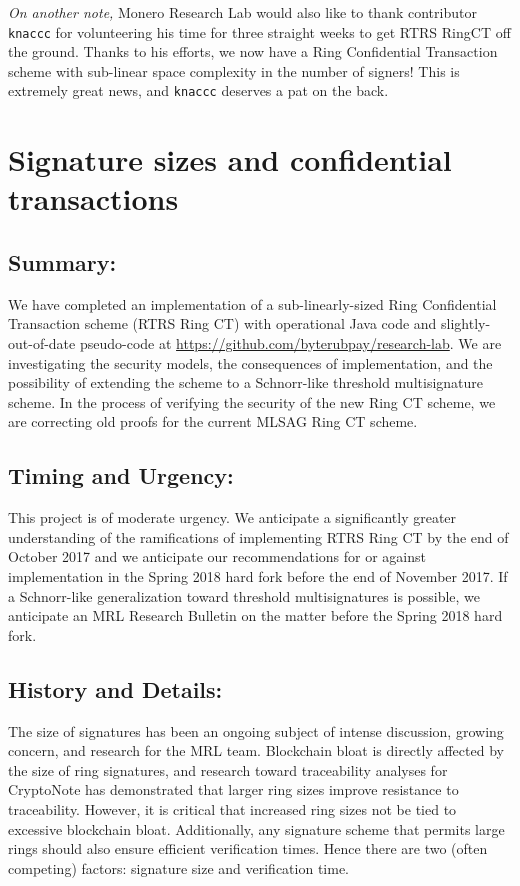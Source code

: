 \documentclass[12pt,english]{mrl}
\theoremstyle{definition}
\numberwithin{equation}{section}
\numberwithin{figure}{section}
\numberwithin{equation}{section}
\numberwithin{equation}{section}
\numberwithin{figure}{section}
\begin{document}
\textit{On another note,} Monero Research Lab would also like to thank contributor \texttt{knaccc} for volunteering his time for three straight weeks to get RTRS RingCT off the ground. Thanks to his efforts, we now have a Ring Confidential Transaction scheme with sub-linear space complexity in the number of signers! This is extremely great news, and \texttt{knaccc} deserves a pat on the back.


\vspace{0.1in}

\section{Signature sizes and confidential transactions} \label{secOne}

\subsection{Summary:} 

We have completed an implementation of a sub-linearly-sized Ring Confidential Transaction scheme (RTRS Ring CT) with operational Java code and slightly-out-of-date pseudo-code at \url{https://github.com/byterubpay/research-lab}. We are investigating the security models, the consequences of implementation, and the possibility of extending the scheme to a Schnorr-like threshold multisignature scheme. In the process of verifying the security of the new Ring CT scheme, we are correcting old proofs for the current MLSAG Ring CT scheme.

\subsection{Timing and Urgency:} 

This project is of moderate urgency. We anticipate a significantly greater understanding of the ramifications of implementing RTRS Ring CT by the end of October 2017 and we anticipate our recommendations for or against implementation in the Spring 2018 hard fork before the end of November 2017. If a Schnorr-like generalization toward threshold multisignatures is possible, we anticipate an MRL Research Bulletin on the matter before the Spring 2018 hard fork.

\subsection{History and Details:} 

The size of signatures has been an ongoing subject of intense discussion, growing concern, and research for the MRL team. Blockchain bloat is directly affected by the size of ring signatures, and research toward traceability analyses for CryptoNote has demonstrated that larger ring sizes improve resistance to traceability. However, it is critical that increased ring sizes not be tied to excessive blockchain bloat. Additionally, any signature scheme that permits large rings should also ensure efficient verification times. Hence there are two (often competing) factors: signature size and verification time.
\end{document}
